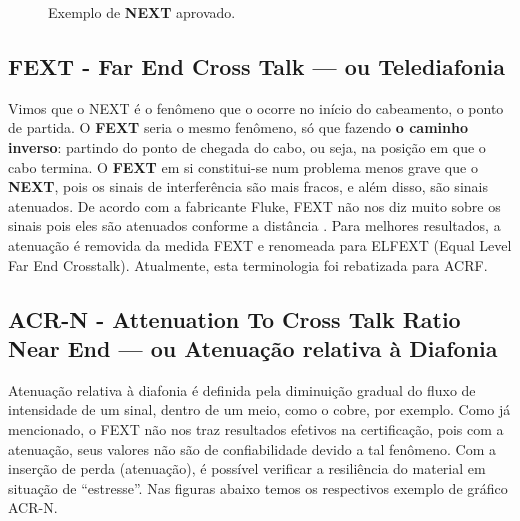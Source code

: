 \documentclass[	DIV=calc,%
							paper=a4,%
							fontsize=12pt,%
							onecolumn]{scrartcl}	 					%
\begin{document}
\begin{figure}[H]
	\noindent{}
	\caption{Exemplo de \textbf{NEXT} aprovado. \cite{next}}
	\label{fig4}
\end{figure}


\subsection{FEXT - Far End Cross Talk --- ou Telediafonia}
Vimos que o NEXT é o fenômeno que o ocorre no início do cabeamento, o ponto de partida. O \textbf{FEXT} seria o mesmo fenômeno, só que fazendo \textbf{o caminho inverso}: partindo do ponto de chegada do cabo, ou seja, na posição em que o cabo termina. O \textbf{FEXT} em si constitui-se num problema menos grave que o \textbf{NEXT}, pois os sinais de interferência são mais fracos, e além disso, são sinais atenuados. De acordo com a fabricante Fluke, FEXT não nos diz muito sobre os sinais pois eles são atenuados conforme a distância \cite{understading}. Para melhores resultados, a atenuação é removida da medida FEXT e renomeada para ELFEXT (Equal Level Far End Crosstalk). Atualmente, esta terminologia foi rebatizada para ACRF. 

\subsection{ACR-N - Attenuation To Cross Talk Ratio Near End --- ou Atenuação relativa à Diafonia}
Atenuação relativa à diafonia é definida pela diminuição gradual do fluxo de intensidade de um sinal, dentro de um meio, como o cobre, por exemplo. Como já mencionado, o FEXT não nos traz resultados efetivos na certificação, pois com a atenuação, seus valores não são de confiabilidade devido a tal fenômeno. Com a inserção de perda (atenuação), é possível verificar a resiliência do material em situação de ``estresse''. Nas figuras abaixo temos os respectivos exemplo de gráfico ACR-N.
\end{document}
